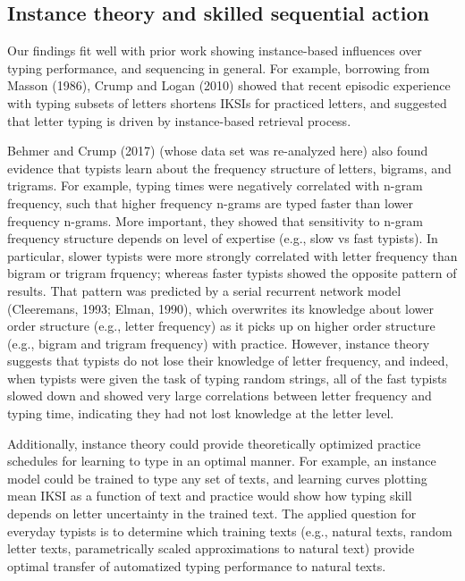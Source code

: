 \documentclass[,man,floatsintext]{apa6}
\begin{document}
\hypertarget{instance-theory-and-skilled-sequential-action}{%
\subsection{Instance theory and skilled sequential action}\label{instance-theory-and-skilled-sequential-action}}

Our findings fit well with prior work showing instance-based influences over typing performance, and sequencing in general. For example, borrowing from Masson (1986), Crump and Logan (2010) showed that recent episodic experience with typing subsets of letters shortens IKSIs for practiced letters, and suggested that letter typing is driven by instance-based retrieval process.

Behmer and Crump (2017) (whose data set was re-analyzed here) also found evidence that typists learn about the frequency structure of letters, bigrams, and trigrams. For example, typing times were negatively correlated with n-gram frequency, such that higher frequency n-grams are typed faster than lower frequency n-grams. More important, they showed that sensitivity to n-gram frequency structure depends on level of expertise (e.g., slow vs fast typists). In particular, slower typists were more strongly correlated with letter frequency than bigram or trigram frquency; whereas faster typists showed the opposite pattern of results. That pattern was predicted by a serial recurrent network model (Cleeremans, 1993; Elman, 1990), which overwrites its knowledge about lower order structure (e.g., letter frequency) as it picks up on higher order structure (e.g., bigram and trigram frequency) with practice. However, instance theory suggests that typists do not lose their knowledge of letter frequency, and indeed, when typists were given the task of typing random strings, all of the fast typists slowed down and showed very large correlations between letter frequency and typing time, indicating they had not lost knowledge at the letter level.

Additionally, instance theory could provide theoretically optimized practice schedules for learning to type in an optimal manner. For example, an instance model could be trained to type any set of texts, and learning curves plotting mean IKSI as a function of text and practice would show how typing skill depends on letter uncertainty in the trained text. The applied question for everyday typists is to determine which training texts (e.g., natural texts, random letter texts, parametrically scaled approximations to natural text) provide optimal transfer of automatized typing performance to natural texts.
\end{document}
